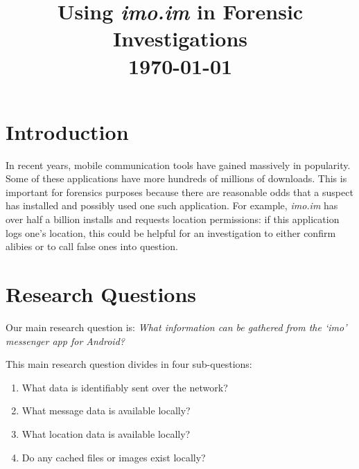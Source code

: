 \documentclass[conference]{IEEEtran}
\begin{document}
\title{Using {\it imo.im} in Forensic Investigations \\\vspace{5mm} \large  \today}
\author{
\and
{}
}
\maketitle
\thispagestyle{plain}
\pagestyle{plain}


\section{Introduction}

In recent years, mobile communication tools have gained massively in
popularity. Some of these applications have more hundreds of millions of
downloads. This is important for forensics purposes because there are
reasonable odds that a suspect has installed and possibly used one such
application. For example, {\it imo.im} has over half a billion installs and
requests location permissions: if this application logs one's location, this
could be helpful for an investigation to either confirm alibies or to call
false ones into question.


\section{Research Questions}

Our main research question is:
{\it What information can be gathered from the `imo' messenger app for Android?}

This main research question divides in four sub-questions:

\begin{enumerate}
    \item What data is identifiably sent over the network?
    \item What message data is available locally?
    \item What location data is available locally?
    \item Do any cached files or images exist locally?
\end{enumerate}
\end{document}
